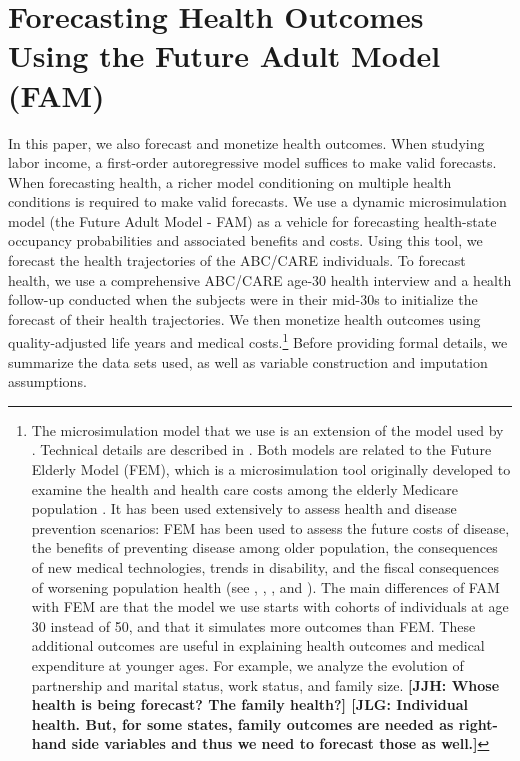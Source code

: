 \section{Forecasting Health Outcomes Using the Future Adult Model (FAM)} \label{appendix:health}

In this paper, we also forecast and monetize health outcomes. When studying labor income, a first-order autoregressive model suffices to make valid forecasts. When forecasting health, a richer model conditioning on multiple health conditions is required to make valid forecasts. We use a dynamic microsimulation model (the Future Adult Model - FAM) as a vehicle for forecasting health-state occupancy probabilities and associated benefits and costs. Using this tool, we forecast the health trajectories of the ABC/CARE individuals. To forecast health, we use a comprehensive ABC/CARE age-30 health interview and a health follow-up conducted when the subjects were in their mid-30s to initialize the forecast of their health trajectories. We then monetize health outcomes using quality-adjusted life years and medical costs.\footnote{The  microsimulation model that we use is an extension of the model used by \citet{Prados_etal_2015_How-Much-Can-Education}. Technical details are described in \citet{Goldman_etal_2015_Future-Adult-Model}. Both models are related to the Future Elderly Model (FEM), which is a microsimulation tool originally developed to examine the health and health care costs among the elderly Medicare population \citep{Goldman_etal_2004_RAND-Report_Health-Status-Elderly}. It has been used extensively to assess health and disease prevention scenarios: FEM has been used to assess the future costs of disease, the benefits of preventing disease among older population, the consequences of new medical technologies, trends in disability, and the fiscal consequences of worsening population health (see \citet{Goldman_etal_2004_RAND-Report_Health-Status-Elderly}, \citet{Lakdawalla_etal_2004_Health-and-Cost}, \citet{Goldman_etal_2005_HA}, and \citet{Zissimopoulos_etal_2014_Delaying-Alzheimers}). The main differences of FAM with FEM are that the model we use starts with cohorts of individuals at age 30 instead of 50, and that it simulates more outcomes than FEM. These additional outcomes are useful in explaining health outcomes and medical expenditure at younger ages. For example, we analyze the evolution of partnership and marital status, work status, and family size. \textbf{[JJH: Whose health is being forecast? The family health?] [JLG: Individual health. But, for some states, family outcomes are needed as right-hand side variables and thus we need to forecast those as well.]}} Before providing formal details, we summarize the data sets used, as well as variable construction and imputation assumptions. 


